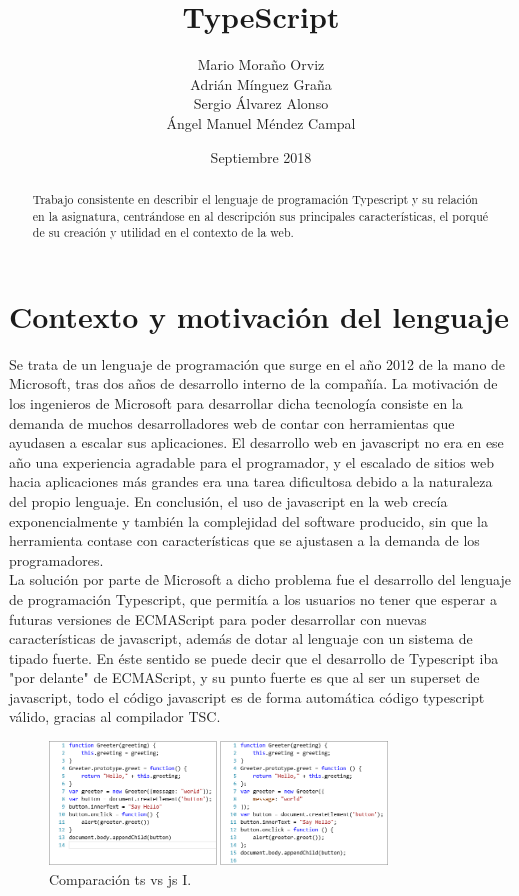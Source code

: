 \documentclass[12pt,twoside,a4paper, spanish]{article}
\begin{document}
	
	\title{TypeScript}
	\author{Mario Moraño Orviz \\
	Adrián Mínguez Graña \\
	Sergio Álvarez Alonso \\
	Ángel Manuel Méndez Campal}
	\date{Septiembre 2018}
	\maketitle
	
	\begin{abstract}
	Trabajo consistente en describir el lenguaje de programación Typescript y su relación en la asignatura, centrándose en al descripción sus principales características, el porqué de su creación y utilidad en el contexto de la web.
	\end{abstract}

    \section{Contexto y motivación del lenguaje}
    Se trata de un lenguaje de programación que surge en el año 2012 de la mano de Microsoft, tras dos años de desarrollo interno de la compañía. La motivación de los ingenieros de Microsoft para desarrollar dicha tecnología consiste en la demanda de muchos desarrolladores web de contar con herramientas que ayudasen a escalar sus aplicaciones. El desarrollo web en javascript no era en ese año una experiencia agradable para el programador, y el escalado de sitios web hacia aplicaciones más grandes era una tarea dificultosa debido a la naturaleza del propio lenguaje. En conclusión, el uso de javascript en la web crecía exponencialmente y también la complejidad del software producido, sin que la herramienta contase con características que se ajustasen a la demanda de los programadores. \\
    
    La solución por parte de Microsoft a dicho problema fue el desarrollo del lenguaje de programación Typescript, que permitía a los usuarios no tener que esperar a futuras versiones de ECMAScript para poder desarrollar con nuevas características de javascript, además de dotar al lenguaje con un sistema de tipado fuerte. En éste sentido se puede decir que el desarrollo de Typescript iba "por delante" de ECMAScript, y su punto fuerte es que al ser un superset de javascript, todo el código javascript es de forma automática código typescript válido, gracias al compilador TSC.
    
    \begin{figure}[h]
    	\centering
    	\includegraphics[width=0.8\textwidth]{imagenes/ts3.png}
    	\caption{Comparación ts vs js I.}
    \end{figure}
\end{document}
